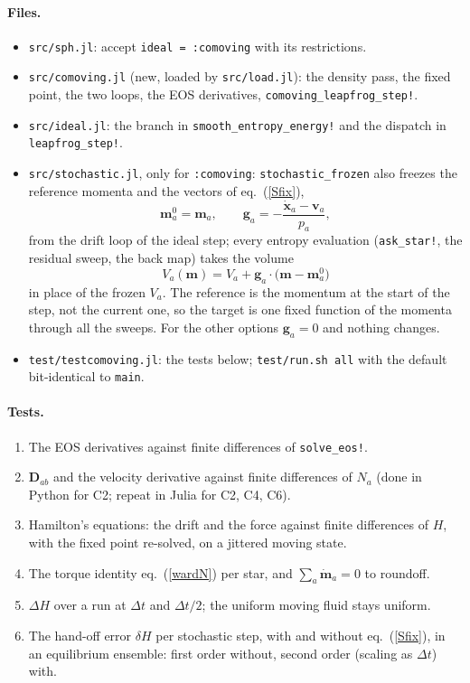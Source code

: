 \documentclass[11pt,aps,preprint,nofootinbib,superscriptaddress,tightenlines]{revtex4-2}
\def\st{\begin{equation}}
\def\stp{\end{equation}}
\def\Eq#1{eq.~(\ref{#1})}
\let\oldparagraph\paragraph
\renewcommand{\paragraph}{\par\bigskip\oldparagraph}
\begin{document}
\paragraph{Files.}
\begin{itemize}
\item \texttt{src/sph.jl}: accept \texttt{ideal = :comoving} with its restrictions.
\item \texttt{src/comoving.jl} (new, loaded by \texttt{src/load.jl}): the density pass, the fixed point, the two loops, the EOS derivatives,
  \texttt{comoving\_leapfrog\_step!}.
\item \texttt{src/ideal.jl}: the branch in \texttt{smooth\_entropy\_energy!} and the dispatch in \texttt{leapfrog\_step!}.
\item \texttt{src/stochastic.jl}, only for \texttt{:comoving}: \texttt{stochastic\_frozen} also freezes the reference momenta and the
  vectors of \Eq{Sfix},
  \st
  \bm m_a^0=\bm m_a,\qquad \bm g_a=-\frac{\dot{\bm x}_a-\bm v_a}{p_a} ,
  \stp
  from the drift loop of the ideal step; every entropy evaluation (\texttt{ask\_star!}, the residual sweep, the back map) takes the volume
  \st
  V_a(\bm m)=V_a+\bm g_a\cdot\big(\bm m-\bm m_a^0\big)
  \stp
  in place of the frozen $V_a$.  The reference is the momentum at the start of the step, not the current one, so the target is one fixed
  function of the momenta through all the sweeps.  For the other options $\bm g_a=0$ and nothing changes.
\item \texttt{test/testcomoving.jl}: the tests below; \texttt{test/run.sh all} with the default bit-identical to \texttt{main}.
\end{itemize}

\paragraph{Tests.}
\begin{enumerate}
\item The EOS derivatives against finite differences of \texttt{solve\_eos!}.
\item $\bm D_{ab}$ and the velocity derivative against finite differences of $N_a$ (done in Python for C2; repeat in Julia for C2, C4, C6).
\item Hamilton's equations: the drift and the force against finite differences of $H$, with the fixed point re-solved, on a jittered
  moving state.
\item The torque identity \Eq{wardN} per star, and $\sum_a\dot{\bm m}_a=0$ to roundoff.
\item $\Delta H$ over a run at $\Delta t$ and $\Delta t/2$; the uniform moving fluid stays uniform.
\item The hand-off error $\delta H$ per stochastic step, with and without \Eq{Sfix}, in an equilibrium ensemble: first order without,
  second order (scaling as $\Delta t$) with.
\end{enumerate}
\end{document}
